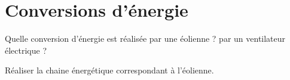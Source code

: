 \section{Conversions d'énergie}\label{ex:conversion}

\begin{questions}
	\question Quelle conversion d'énergie est réalisée par une éolienne ? par un ventilateur électrique ?
	
	\question Réaliser la chaine énergétique correspondant à l'éolienne.
\end{questions}